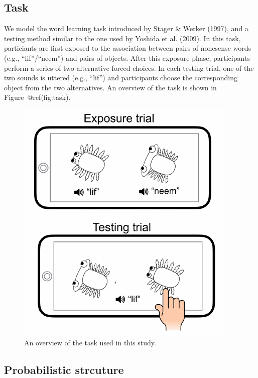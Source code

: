 \documentclass[10pt, letterpaper]{article}
\newenvironment{CodeChunk}{}{}
\begin{document}
\subsection{Task}\label{task}

We model the word learning task introduced by Stager \& Werker (1997),
and a testing method similar to the one used by Yoshida et al. (2009).
In this task, particiants are first exposed to the association between
pairs of nonesense words (e.g., ``lif''/``neem'') and pairs of objects.
After this exposure phase, participants perform a series of
two-alternative forced choices. In each testing trial, one of the two
sounds is uttered (e.g., ``lif'') and participants choose the
corresponding object from the two alternatives. An overview of the task
is shown in Figure~@ref(fig:task).

\begin{CodeChunk}
\begin{figure}[t]

{\centering \includegraphics{figs/task-1} 

}

\caption{\label{fig:task}An overview of the task used in this study.}\label{fig:task}
\end{figure}
\end{CodeChunk}

\subsection{Probabilistic strcuture}\label{probabilistic-strcuture}
\end{document}

